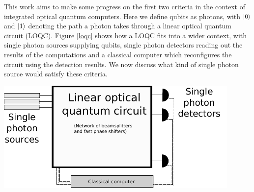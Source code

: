 This work aims to make some progress on the first two criteria in the context of integrated optical quantum computers. Here we define qubits as photons, with $\ket{0}$ and $\ket{1}$ denoting the path a photon takes through a linear optical quantum circuit (LOQC). Figure \ref{loqc} shows how a LOQC fits into a wider context, with single photon sources supplying qubits, single photon detectors reading out the results of the computations and a classical computer which reconfigures the circuit using the detection results. We now discuss what kind of single photon source would satisfy these criteria.

\begingroup
    \centering  
    \includegraphics[width=12cm]{img/theory/loqc.pdf}
     \vspace{3pt} \label{loqc}
\endgroup




